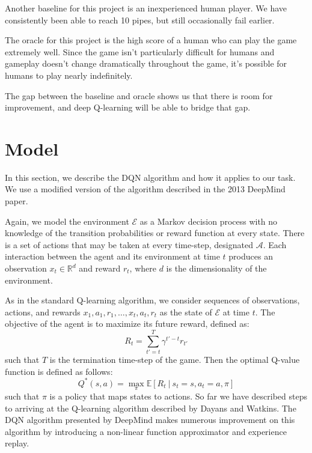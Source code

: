 \documentclass{article}
\begin{document}
Another baseline for this project is an inexperienced human player. 
We have consistently been able to reach 10 pipes, but still occasionally fail earlier.

The oracle for this project is the high score of a human who can play the game extremely well.
Since the game isn't particularly difficult for humans and gameplay doesn't change dramatically throughout the game, it's possible for humans to play nearly indefinitely.

The gap between the baseline and oracle shows us that there is room for improvement, and deep Q-learning will be able to bridge that gap.

\section{Model}

In this section, we describe the DQN algorithm and how it applies to our task. We use a modified version of the algorithm described in the 2013 DeepMind paper.

Again, we model the environment $\mathcal{E}$ as a Markov decision process with no knowledge of the transition probabilities or reward function at every state.
There is a set of actions that may be taken at every time-step, designated $\mathcal{A}$.
Each interaction between the agent and its environment at time $t$ produces an observation $x_t \in \mathbb{R}^{d}$ and reward $r_t$, where $d$ is the dimensionality of the environment.

As in the standard Q-learning algorithm, we consider sequences of observations, actions, and rewards $x_1, a_1, r_1, \dots, x_t, a_t, r_t$ as the state of $\mathcal{E}$ at time $t$. 
The objective of the agent is to maximize its future reward, defined as:
\begin{equation}
\displaystyle R_t = \sum_{t' = t}^{T} \gamma^{t' - t}r_{t'}
\end{equation}
such that $T$ is the termination time-step of the game.
Then the optimal Q-value function is defined as follows:
\begin{equation}
\displaystyle Q^{*}(s, a) = \max_{\pi}\mathbb{E}[R_t\ |\ s_t = s, a_t = a, \pi]
\end{equation}
such that $\pi$ is a policy that maps states to actions.
So far we have described steps to arriving at the Q-learning algorithm described by Dayans and Watkins. \cite{qlearning} 
The DQN algorithm presented by DeepMind makes numerous improvement on this algorithm by introducing a non-linear function approximator and experience replay.
\end{document}
